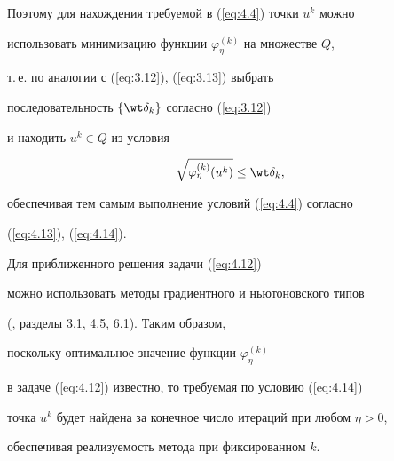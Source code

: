 Поэтому для нахождения требуемой в (\ref{eq:4.4}) точки $u^{k}$ можно 


использовать минимизацию функции $\varphi^{(k)}_{\eta}$ на множестве $Q$,


т.\,е. по аналогии с (\ref{eq:3.12}), (\ref{eq:3.13}) выбрать 


последовательность $\{\wt \delta_{k} \}$ согласно (\ref{eq:3.12}) 


и находить $u^{k} \in Q$ из условия


\begin{equation} \label{eq:4.14} 


\sqrt{\varphi^{(k)}_{\eta} (u^{k})} \leq \wt \delta_{k},


\end{equation}


обеспечивая тем самым выполнение условий (\ref{eq:4.4}) согласно 


(\ref{eq:4.13}), (\ref{eq:4.14}). 


Для приближенного решения задачи (\ref{eq:4.12}) 


можно использовать методы градиентного и ньютоновского типов


(\cite{Pat99}, разделы 3.1, 4.5, 6.1). Таким образом, 


поскольку оптимальное значение функции $ \varphi^{(k)}_{\eta}$ 


в задаче (\ref{eq:4.12}) известно, то требуемая по условию (\ref{eq:4.14})


точка $u^{k}$ будет найдена за конечное число итераций при любом $\eta > 0$, 


обеспечивая реализуемость метода при фиксированном $k$.





